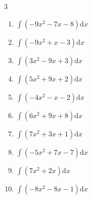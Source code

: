\begin{multicols}{3}
\begin{enumerate}

\columnbreak %

  \item $\displaystyle \int \left( -9x^{2}-7x-8 \right) \mathrm{d}x$


  \item $\displaystyle \int \left( -9x^{2}+x-3 \right) \mathrm{d}x$


  \item $\displaystyle \int \left( 3x^{2}-9x+3 \right) \mathrm{d}x$


  \item $\displaystyle \int \left( 5x^{2}+9x+2 \right) \mathrm{d}x$


  \item $\displaystyle \int \left( -4x^{2}-x-2 \right) \mathrm{d}x$


  \item $\displaystyle \int \left( 6x^{2}+9x+8 \right) \mathrm{d}x$


  \item $\displaystyle \int \left( 7x^{2}+3x+1 \right) \mathrm{d}x$


  \item $\displaystyle \int \left( -5x^{2}+7x-7 \right) \mathrm{d}x$


  \item $\displaystyle \int \left( 7x^{2}+2x \right) \mathrm{d}x$


  \item $\displaystyle \int \left( -8x^{2}-8x-1 \right) \mathrm{d}x$


\end{enumerate}
\end{multicols}
